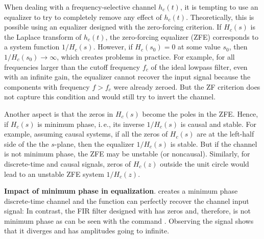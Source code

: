 When dealing with a frequency-selective channel $h_c(t)$, it is tempting to use an equalizer to try to completely remove any effect of $h_c(t)$. Theoretically, this is possible using an equalizer designed with the zero-forcing criterion. If $H_c(s)$ is the Laplace transform of $h_c(t)$, the zero-forcing equalizer (ZFE) corresponds to a system function $1/H_c(s)$. However, if $H_c(s_0)=0$ at some value $s_0$, then $1/H_c(s_0) \rightarrow \infty$, which creates problems in practice. For example, for all frequencies larger than the cutoff frequency $f_c$ of the ideal lowpass filter, even with an infinite gain, the equalizer cannot recover the input signal because the components with frequency $f > f_c$ were already zeroed. But the ZF criterion does not capture this condition
and would still try to invert the channel.

Another aspect is that the zeros in $H_c(s)$ become the poles in the ZFE. Hence, if $H_c(s)$ is minimum phase, i.\,e., its inverse $1/H_c(s)$ is causal and stable. For example, assuming causal systems, if all the zeros of $H_c(s)$ are at the left-half side of the the $s$-plane, then the equalizer $1/H_c(s)$ is stable. But if the channel is not minimum phase, the ZFE may be unstable (or noncausal). Similarly, for discrete-time and causal signals, zeros of $H_c(z)$ outside the unit circle would lead to an unstable ZFE system $1/H_c(z)$. 

\bExample \textbf{Impact of minimum phase in equalization}.
 creates a minimum phase discrete-time channel and the function  can perfectly recover the channel input signal:
In contrast, the FIR filter designed with  has zeros 
\co{[-16.79 -1.0 -0.06]} and, therefore, is not minimum phase as can be seen with the command .
Observing the signal  shows that it diverges and has amplitudes going to infinite.
\eExample

